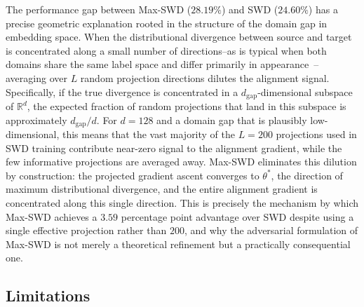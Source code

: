 \documentclass{article}
\begin{document}
	The performance gap between Max-SWD ($28.19\%$) and SWD ($24.60\%$) has a precise geometric explanation rooted in the structure of the domain gap in embedding space. When the distributional divergence between source and target is concentrated along a small number of directions--as is typical when both domains share the same label space and differ primarily in appearance~\citep{yaroslav}--averaging over $L$ random projection directions dilutes the alignment signal. Specifically, if the true divergence is concentrated in a $d_{\mathrm{gap}}$-dimensional subspace of $\mathbb{R}^d$, the expected fraction of random projections that land in this subspace is approximately $d_{\mathrm{gap}} / d$. For $d = 128$ and a domain gap that is plausibly low-dimensional, this means that the vast majority of the $L = 200$ projections used in SWD training contribute near-zero signal to the alignment gradient, while the few informative projections are averaged away. Max-SWD eliminates this dilution by construction: the projected gradient ascent converges to $\theta^*$, the direction of maximum distributional divergence, and the entire alignment gradient is concentrated along this single direction. This is precisely the mechanism by which Max-SWD achieves a $3.59$ percentage point advantage over SWD despite using a single effective projection rather than $200$, and why the adversarial formulation of Max-SWD is not merely a theoretical refinement but a practically consequential one.
	
	
	\subsection{Limitations}
	
\end{document}
